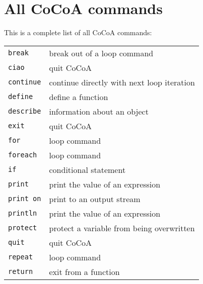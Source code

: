 \documentclass[a4paper]{mybook}
\begin{document}
\section{All CoCoA commands}
\label{All CoCoA commands}

        
This is a complete list of all CoCoA commands:

\begin{center}
\begin{longtable}{ll}
   
{\verb~break~} &
      break out of a loop command\\
   
{\verb~ciao~} &
      quit CoCoA\\
   
{\verb~continue~} &
      continue directly with next loop iteration\\
   
{\verb~define~} &
      define a function\\
   
{\verb~describe~} &
      information about an object\\
   
{\verb~exit~} &
      quit CoCoA\\
   
{\verb~for~} &
      loop command\\
   
{\verb~foreach~} &
      loop command\\
   
{\verb~if~} &
      conditional statement\\
   
{\verb~print~} &
      print the value of an expression\\
   
{\verb~print on~} &
      print to an output stream\\
   
{\verb~println~} &
      print the value of an expression\\
   
{\verb~protect~} &
      protect a variable from being overwritten\\
   
{\verb~quit~} &
      quit CoCoA\\
   
{\verb~repeat~} &
      loop command\\
   
{\verb~return~} &
      exit from a function\\
   

\end{longtable}
\end{center}
\end{document}
